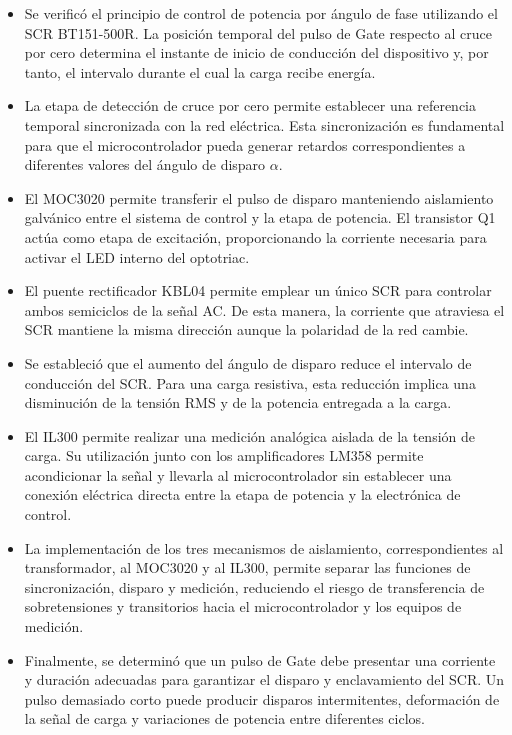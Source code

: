 \documentclass[12pt]{article}
\begin{document}
\begin{itemize}

    \item Se verificó el principio de control de potencia por ángulo de fase
    utilizando el SCR BT151-500R. La posición temporal del pulso de Gate
    respecto al cruce por cero determina el instante de inicio de conducción
    del dispositivo y, por tanto, el intervalo durante el cual la carga
    recibe energía.

    \item La etapa de detección de cruce por cero permite establecer una
    referencia temporal sincronizada con la red eléctrica. Esta sincronización
    es fundamental para que el microcontrolador pueda generar retardos
    correspondientes a diferentes valores del ángulo de disparo $\alpha$.

    \item El MOC3020 permite transferir el pulso de disparo manteniendo
    aislamiento galvánico entre el sistema de control y la etapa de potencia.
    El transistor Q1 actúa como etapa de excitación, proporcionando la
    corriente necesaria para activar el LED interno del optotriac.

    \item El puente rectificador KBL04 permite emplear un único SCR para
    controlar ambos semiciclos de la señal AC. De esta manera, la corriente
    que atraviesa el SCR mantiene la misma dirección aunque la polaridad de
    la red cambie.

    \item Se estableció que el aumento del ángulo de disparo reduce el
    intervalo de conducción del SCR. Para una carga resistiva, esta reducción
    implica una disminución de la tensión RMS y de la potencia entregada a
    la carga.

    \item El IL300 permite realizar una medición analógica aislada de la
    tensión de carga. Su utilización junto con los amplificadores LM358
    permite acondicionar la señal y llevarla al microcontrolador sin
    establecer una conexión eléctrica directa entre la etapa de potencia y
    la electrónica de control.

    \item La implementación de los tres mecanismos de aislamiento,
    correspondientes al transformador, al MOC3020 y al IL300, permite
    separar las funciones de sincronización, disparo y medición, reduciendo
    el riesgo de transferencia de sobretensiones y transitorios hacia el
    microcontrolador y los equipos de medición.

    \item Finalmente, se determinó que un pulso de Gate debe presentar una
    corriente y duración adecuadas para garantizar el disparo y enclavamiento
    del SCR. Un pulso demasiado corto puede producir disparos intermitentes,
    deformación de la señal de carga y variaciones de potencia entre
    diferentes ciclos.

\end{itemize}
\end{document}
